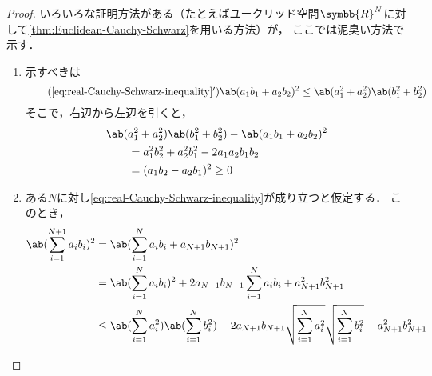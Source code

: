 \documentclass[../sotsu.tex]{subfiles}
\begin{document}
\begin{proof}
    いろいろな証明方法がある（たとえばユークリッド空間$\symbb{R}^N$に対して\cref{thm:Euclidean-Cauchy-Schwarz}を用いる方法）が，
    ここでは泥臭い方法で示す．
    \begin{enumerate}
        \item {}\quad
            示すべきは
            \begin{equation}
                \tag{\ref*{eq:real-Cauchy-Schwarz-inequality}$'$}
                \label{eq:eq:real-2-Cauchy-Schwarz-inequality}
                \ab( a_1 b_1 + a_2 b_2 )^2
                \leq
                \ab( a_1^2 + a_2^2 )
                \ab( b_1^2 + b_2^2 )
            \end{equation}
            そこで，右辺から左辺を引くと，
            \begin{equation*}
                \begin{split}
                    \MoveEqLeft
                    \ab( a_1^2 + a_2^2 ) \ab( b_1^2 + b_2^2 )
                        - \ab( a_1 b_1 + a_2 b_2 )^2
                    \\
                    &= a_1^2 b_2^2 + a_2^2 b_1^2 - 2 a_1 a_2 b_1 b_2
                    \\
                    &= (a_1 b_2 - a_2 b_1)^2
                    \geq 0
                \end{split}
            \end{equation*}
        \item {}\quad
            ある$N$に対し\cref{eq:real-Cauchy-Schwarz-inequality}が成り立つと仮定する．
            このとき，
            \begin{equation*}
                \begin{split}
                    \ab( \sum_{i = 1}^{N+1} a_i b_i )^2
                    &= \ab( \sum_{i = 1}^{N} a_i b_i + a_{N+1} b_{N+1} )^2
                    \\
                    &= \ab( \sum_{i = 1}^{N} a_i b_i )^2 
                        + 2 a_{N+1} b_{N+1} \sum_{i = 1}^{N} a_i b_i
                        + a_{N+1}^2 b_{N+1}^2
                    \\
                    &\leq 
                        \ab( \sum_{i = 1}^{N} a_i^2 )
                        \ab( \sum_{i = 1}^{N} b_i^2 )
                        + 2 a_{N+1} b_{N+1} 
                            \sqrt{ \sum_{i = 1}^{N} a_i^2 }
                            \sqrt{ \sum_{i = 1}^{N} b_i^2 }
                        + a_{N+1}^2 b_{N+1}^2

\end{split}
\end{equation*}
\end{enumerate}
\end{proof}
\end{document}
